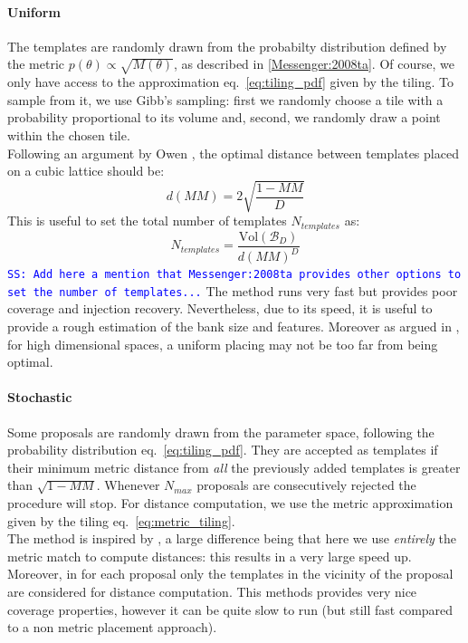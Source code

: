 \documentclass[twocolumn,showpacs,preprintnumbers,nofootinbib,prd,
superscriptaddress,10pt]{revtex4-2}
\newcommand{\stefano}[1]{{\textcolor{blue}{\texttt{SS: #1}} }}
\begin{document}
\paragraph{Uniform}\label{par:uniform}
The templates are randomly drawn from the probabilty distribution defined by the metric $p(\theta) \propto \sqrt{M(\theta)}$, as described in \ref{Messenger:2008ta}.
Of course, we only have access to the approximation eq.~\eqref{eq:tiling_pdf} given by the tiling. To sample from it, we use Gibb's sampling: first we randomly choose a tile with a probability proportional to its volume and, second, we randomly draw a point within the chosen tile.
\\
Following an argument by Owen \cite{owen_metric}, the optimal distance between templates placed on a cubic lattice should be:
\begin{equation}
	d(MM) = 2 \sqrt{\frac{1-MM}{D}}
\end{equation}
This is useful to set the total number of templates $N_{templates}$ as:
\begin{equation} \label{eq:N_templates}
	N_{templates} = \frac{\text{Vol}(\mathcal{B}_D)}{d(MM)^D}
\end{equation}
\stefano{Add here a mention that Messenger:2008ta provides other options to set the number of templates...}
The method runs very fast but provides poor coverage and injection recovery. Nevertheless, due to its speed, it is useful to provide a rough estimation of the bank size and features.
Moreover as argued in \cite{Messenger:2008ta, Allen:2021yuy, Allen:2022lqr}, for high dimensional spaces, a uniform placing may not be too far from being optimal.

\paragraph{Stochastic}\label{par:stochastic}
Some proposals are randomly drawn from the parameter space, following the probability distribution eq.~\eqref{eq:tiling_pdf}. They are accepted as templates if their minimum metric distance from {\it all} the previously added templates is greater than  $\sqrt{1-MM}$.
Whenever $N_{max}$ proposals are consecutively rejected the procedure will stop. For distance computation, we use the metric approximation given by the tiling eq.~\eqref{eq:metric_tiling}.
\\
The method is inspired by \cite{PhysRevD.80.104014}, a large difference being that here we use {\it entirely} the metric match to compute distances: this results in a very large speed up. Moreover, in \cite{PhysRevD.80.104014} for each proposal only the templates in the vicinity of the proposal are considered for distance computation.
This methods provides very nice coverage properties, however it can be quite slow to run (but still fast compared to a non metric placement approach).
\end{document}
